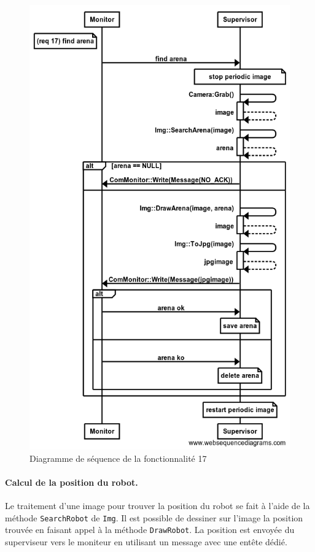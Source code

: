 \begin{figure}[htbp]
\begin{center}
\includegraphics[scale=0.4]{./seq_req/req17}
\caption{Diagramme de séquence de la fonctionnalité 17}
\label{fig:diag16}
\end{center}
\end{figure}
\FloatBarrier

\paragraph{Calcul de la position du robot.} Le traitement d'une image pour trouver la position du robot se fait à l'aide de la méthode {\tt SearchRobot} de {\tt Img}. Il est possible de dessiner sur l'image la position trouvée en faisant appel à la méthode {\tt DrawRobot}. La position est envoyée du superviseur vers le moniteur en utilisant un message avec une entête dédié.\\
 
